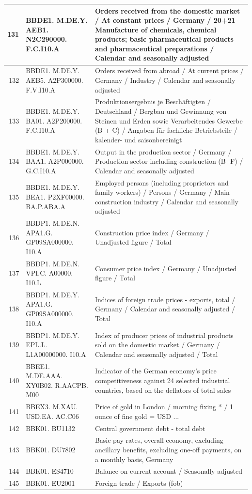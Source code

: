 \documentclass[12pt]{article}
\begin{document}
\begin{table}[ht]
\centering
\begin{tabular}{r|p{4cm}p{11cm}}
	\hline
	131 & BBDE1. M.DE.Y. AEB1. N2C290000. F.C.I10.A & Orders received from the domestic market / At constant prices / Germany / 20+21 Manufacture of chemicals, chemical products; basic pharmaceutical products and pharmaceutical preparations / Calendar and seasonally adjusted \\ 
	\hline
	132 & BBDE1. M.DE.Y. AEB5. A2P300000. F.V.I10.A & Orders received from abroad / At current prices / Germany / Industry / Calendar and seasonally adjusted \\ 
	\hline
	133 & BBDE1. M.DE.Y. BA01. A2P200000. F.C.I10.A & Produktionsergebnis je Beschäftigten / Deutschland / Bergbau und Gewinnung von Steinen und Erden sowie Verarbeitendes Gewerbe (B + C) / Angaben für fachliche Betriebsteile / kalender- und saisonbereinigt \\ 
	\hline
	134 & BBDE1. M.DE.Y. BAA1. A2P000000. G.C.I10.A & Output in the production sector / Germany / Production sector including construction (B -F) / Calendar and seasonally adjusted \\ 
	\hline
	135 & BBDE1. M.DE.Y. BEA1. P2XF00000. BA.P.ABA.A & Employed persons (including proprietors and family workers) / Persons / Germany / Main construction industry / Calendar and seasonally adjusted \\ 
	\hline
	136 & BBDP1. M.DE.N. APA1.G. GP09SA000000. I10.A & Construction price index / Germany / Unadjusted figure / Total \\ 
	\hline
	137 & BBDP1. M.DE.N. VPI.C. A00000. I10.L & Consumer price index / Germany / Unadjusted figure / Total \\ 
	\hline
	138 & BBDP1. M.DE.Y. APA1.G. GP09SA000000. I10.A & Indices of foreign trade prices - exports, total / Germany / Calendar and seasonally adjusted / Total \\ 
	\hline
	139 & BBDP1. M.DE.Y. EPL.L. L1A00000000. I10.A & Index of producer prices of industrial products sold on the domestic market / Germany / Calendar and seasonally adjusted / Total \\ 
	\hline
	140 & BBEE1. M.DE.AAA. XY0B02. R.AACPB. M00 & Indicator of the German economy's price competitiveness against 24 selected industrial countries, based on the deflators of total sales \\ 
	\hline
	141 & BBEX3. M.XAU. USD.EA. AC.C06 & Price of gold in London / morning fixing * / 1 ounce of fine gold = USD ... \\
	\hline 
	142 & BBK01. BU1132 & Central government debt - total debt \\ 
	\hline
	143 & BBK01. DU7802 & Basic pay rates, overall economy, excluding ancillary benefits, excluding one-off
	 payments, on a monthly basis, Germany \\ 
	 \hline
	144 & BBK01. ES4710 & Balance on current account / Seasonally adjusted \\ 
	\hline
	145 & BBK01. EU2001 & Foreign trade / Exports (fob) \\ 
	\hline
\end{tabular}
\end{table}
\end{document}
